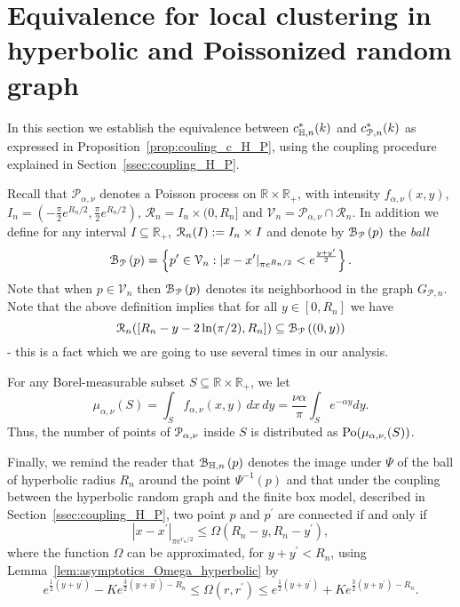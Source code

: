 \section{Equivalence for local clustering in hyperbolic and Poissonized random graph}

In this section we establish the equivalence between $c_{\mathbb{H},n}^\ast(k)$ and $c_{{\mathcal P},n}^\ast(k)$ as expressed in Proposition~\ref{prop:couling_c_H_P}, using the coupling procedure explained in Section~\ref{ssec:coupling_H_P}. 

Recall that $\mathcal{P}_{\alpha,\nu}$ denotes a Poisson process on $\mathbb{R} \times \mathbb{R}_+$, with intensity $f_{\alpha,\nu}(x,y)$, $I_n = \left(-\frac{\pi}{2}e^{R_n/2}, \frac{\pi}{2}e^{R_n/2}\right)$, $\mathcal{R}_n = I_n \times (0,R_n]$ and $\mathcal{V}_n = \mathcal{P}_{\alpha, \nu}\cap \mathcal{R}_n$. In addition we define for any interval $I \subseteq \mathbb{R}_+$, ${\mathcal R}_n(I) := I_n \times I$ and denote by ${\mathcal B}_{{\mathcal P}}\left(p\right)$ the \emph{ball}
\[
	{\mathcal B}_{{\mathcal P}}\left(p\right) = \left\{p^\prime \in \mathcal{V}_n : |x - x^\prime |_{\pi e^{R_n/2}} < e^{\frac{y+y^\prime}{2}}\right\}.
\]
Note that when $p \in \mathcal{V}_n$ then ${\mathcal B}_{{\mathcal P}}\left(p\right)$ denotes its neighborhood in the graph $G_{\mathcal{P},n}$. 
Note that the above definition implies that for all $y\in [0,R_n]$ we have 
\begin{equation} \label{eq:upper_ballPo_inclusion}
{\mathcal R}_n([R_n-y - 2\ln (\pi/2), R_n]) \subseteq {\mathcal B}_{{\mathcal P}}\left((0,y)\right)
\end{equation}
- this is a fact which we are going to use several times in our analysis. 

For any Borel-measurable subset $S \subseteq \mathbb{R} \times \mathbb{R}_+$, we let 
\[
	\mu_{\alpha, \nu} (S) = \int_S f_{\alpha, \nu}(x,y) \, dx \, dy = \frac{\nu \alpha}{\pi}\int_S e^{-\alpha y}dy.
\]
Thus, the number of points of ${\mathcal P}_{\alpha, \nu}$ inside $S$ is distributed as ${\mathrm{Po}} ({\mu_{\alpha, \nu,} (S)})$.

Finally, we remind the reader that ${\mathcal B}_{\mathbb{H},n}\left(p\right)$ denotes the image under $\Psi$ of the ball of hyperbolic radius $R_n$ around the point $\Psi^{-1}(p)$ and that under the coupling between the hyperbolic random graph and the finite box model, described in Section~\ref{ssec:coupling_H_P}, two point $p$ and $p^\prime$ are connected if and only if
\[
	|x-x^\prime|_{\pi e^{r_n/2}} \le \Omega(R_n - y, R_n - y^\prime),
\]
where the function $\Omega$ can be approximated, for $y + y^\prime < R_n$, using Lemma~\ref{lem:asymptotics_Omega_hyperbolic} by  
\[
	e^{\frac{1}{2}(y+y^\prime)} - K e^{\frac{3}{2}(y+y^\prime) - R_n} \leq \Omega(r, r^\prime) 
		\leq  e^{\frac{1}{2}(y+y^\prime)} + K e^{\frac{3}{2}(y+y^\prime) - R_n}.
\]

